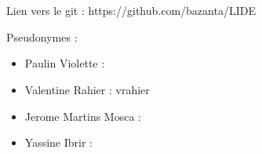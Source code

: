 \chapter{}

Lien vers le git : https://github.com/bazanta/LIDE

Pseudonymes :

\begin{itemize}

	\item Paulin Violette : 
	\item Valentine Rahier : vrahier
	\item Jerome Martins Mosca :
	\item Yassine Ibrir : 

\end{itemize}

